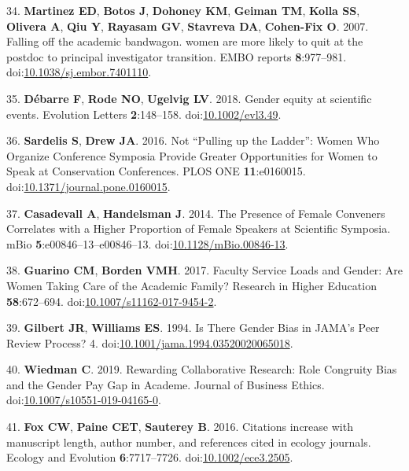 \documentclass[11pt,]{article}
\begin{document}
\hypertarget{ref-Martinez2007}{}
34. \textbf{Martinez ED}, \textbf{Botos J}, \textbf{Dohoney KM},
\textbf{Geiman TM}, \textbf{Kolla SS}, \textbf{Olivera A}, \textbf{Qiu
Y}, \textbf{Rayasam GV}, \textbf{Stavreva DA}, \textbf{Cohen-Fix O}.
2007. Falling off the academic bandwagon. women are more likely to quit
at the postdoc to principal investigator transition. EMBO reports
\textbf{8}:977--981.
doi:\href{https://doi.org/10.1038/sj.embor.7401110}{10.1038/sj.embor.7401110}.

\hypertarget{ref-debarre_gender_2018}{}
35. \textbf{Débarre F}, \textbf{Rode NO}, \textbf{Ugelvig LV}. 2018.
Gender equity at scientific events. Evolution Letters
\textbf{2}:148--158.
doi:\href{https://doi.org/10.1002/evl3.49}{10.1002/evl3.49}.

\hypertarget{ref-sardelis_not_2016}{}
36. \textbf{Sardelis S}, \textbf{Drew JA}. 2016. Not ``Pulling up the
Ladder'': Women Who Organize Conference Symposia Provide Greater
Opportunities for Women to Speak at Conservation Conferences. PLOS ONE
\textbf{11}:e0160015.
doi:\href{https://doi.org/10.1371/journal.pone.0160015}{10.1371/journal.pone.0160015}.

\hypertarget{ref-casadevall_presence_2014}{}
37. \textbf{Casadevall A}, \textbf{Handelsman J}. 2014. The Presence of
Female Conveners Correlates with a Higher Proportion of Female Speakers
at Scientific Symposia. mBio \textbf{5}:e00846--13--e00846--13.
doi:\href{https://doi.org/10.1128/mBio.00846-13}{10.1128/mBio.00846-13}.

\hypertarget{ref-guarino_faculty_2017}{}
38. \textbf{Guarino CM}, \textbf{Borden VMH}. 2017. Faculty Service
Loads and Gender: Are Women Taking Care of the Academic Family? Research
in Higher Education \textbf{58}:672--694.
doi:\href{https://doi.org/10.1007/s11162-017-9454-2}{10.1007/s11162-017-9454-2}.

\hypertarget{ref-gilbert_is_1994}{}
39. \textbf{Gilbert JR}, \textbf{Williams ES}. 1994. Is There Gender
Bias in JAMA's Peer Review Process? 4.
doi:\href{https://doi.org/10.1001/jama.1994.03520020065018}{10.1001/jama.1994.03520020065018}.

\hypertarget{ref-wiedman_rewarding_2019}{}
40. \textbf{Wiedman C}. 2019. Rewarding Collaborative Research: Role
Congruity Bias and the Gender Pay Gap in Academe. Journal of Business
Ethics.
doi:\href{https://doi.org/10.1007/s10551-019-04165-0}{10.1007/s10551-019-04165-0}.

\hypertarget{ref-fox_citations_2016}{}
41. \textbf{Fox CW}, \textbf{Paine CET}, \textbf{Sauterey B}. 2016.
Citations increase with manuscript length, author number, and references
cited in ecology journals. Ecology and Evolution \textbf{6}:7717--7726.
doi:\href{https://doi.org/10.1002/ece3.2505}{10.1002/ece3.2505}.
\end{document}
